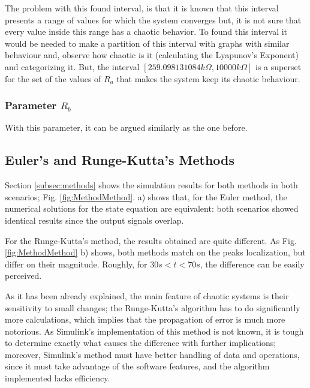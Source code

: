 The problem with this found interval, is that it is known that this interval presents a range of values for which the system converges but, it is not sure that every value inside this range has a chaotic behavior. To found this interval it would be needed to make a partition of this interval with graphs with similar behaviour and, observe how chaotic is it (calculating the Lyapunov's Exponent) and categorizing it. But, the interval $[259.098131084k\Omega,10000k\Omega]$ is a superset for the set of the values of $R_a$ that makes the system keep its chaotic behaviour.

\subsubsection{Parameter \texorpdfstring{$R_b$}{Rc}}
With this parameter, it can be argued similarly as the one before.

\subsection{Euler's and Runge-Kutta's Methods}
Section \ref{subsec:methods} shows the simulation results for both methods in both scenarios; Fig. \ref{fig:MethodMethod}. a) shows that, for the Euler method, the numerical solutions for the state equation are equivalent: both scenarios showed identical results since the output signals overlap.

For the Runge-Kutta's method, the results obtained are quite different. As Fig. \ref{fig:MethodMethod} b) shows, both methods match on the peaks localization, but differ on their magnitude. Roughly, for $30s<t<70s$, the difference can be easily perceived.

As it has been already explained, the main feature of chaotic systems is their sensitivity to small changes; the Runge-Kutta's algorithm has to do significantly more calculations, which implies that the propagation of error is much more notorious. As Simulink's implementation of this method is not known, it is tough to determine exactly what causes the difference with further implications; moreover, Simulink's method must have better handling of data and operations, since it must take advantage of the software features, and the algorithm implemented lacks efficiency.

